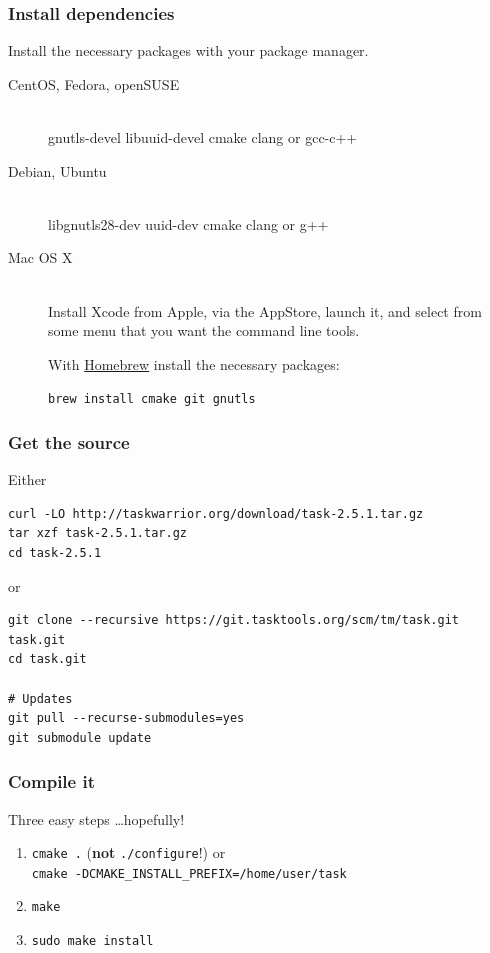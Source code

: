 \documentclass[t,handout]{beamer}
\begin{document}
\begin{frame}[fragile]\frametitle{Install dependencies}
    Install the necessary packages with your package manager.

    \begin{description}
        \item[CentOS, Fedora, openSUSE] \hfill \\
            gnutls-devel libuuid-devel cmake clang or gcc-c++
        \item[Debian, Ubuntu] \hfill \\
            libgnutls28-dev uuid-dev cmake clang or g++
        \item[Mac OS X] \hfill \\
            Install Xcode from Apple, via the AppStore, launch it, and select from some menu that you want the command line tools.

            With \href{http://brew.sh/}{Homebrew} install the necessary packages:

            \verb=brew install cmake git gnutls=
    \end{description}

\end{frame}

\begin{frame}[fragile]\frametitle{Get the source}
    Either

    \begin{lstlisting}
curl -LO http://taskwarrior.org/download/task-2.5.1.tar.gz
tar xzf task-2.5.1.tar.gz
cd task-2.5.1\end{lstlisting} \pause

    or

    \begin{lstlisting}
git clone --recursive https://git.tasktools.org/scm/tm/task.git task.git
cd task.git

# Updates
git pull --recurse-submodules=yes
git submodule update\end{lstlisting}
\end{frame}

\begin{frame}[fragile]\frametitle{Compile it}
    \vfill
    Three easy steps \ldots hopefully! \pause
    \begin{enumerate}
        \item \verb=cmake .= (\textbf{not} \verb=./configure=!) or \\
              \verb+cmake -DCMAKE_INSTALL_PREFIX=/home/user/task+ \pause
        \item \verb=make= \pause
        \item \verb=sudo make install=
    \end{enumerate}
\end{frame}
\end{document}
